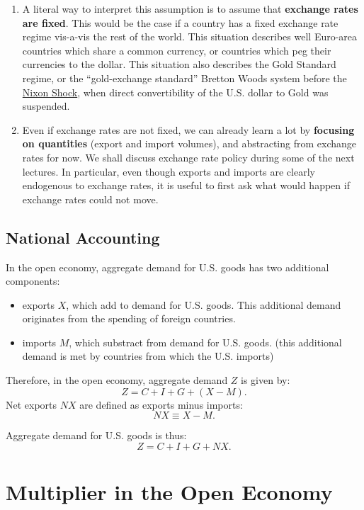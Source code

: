 \documentclass[]{book}
\providecommand{\tightlist}{%
  \setlength{\itemsep}{0pt}\setlength{\parskip}{0pt}}
\begin{document}
\begin{enumerate}
\def\labelenumi{\arabic{enumi}.}
\item
  A literal way to interpret this assumption is to assume that
  \textbf{exchange rates are fixed}. This would be the case if a country
  has a fixed exchange rate regime vis-a-vis the rest of the world. This
  situation describes well Euro-area countries which share a common
  currency, or countries which peg their currencies to the dollar. This
  situation also describes the Gold Standard regime, or the
  ``gold-exchange standard'' Bretton Woods system before the
  \href{https://en.wikipedia.org/wiki/Nixon_shock}{Nixon Shock}, when
  direct convertibility of the U.S. dollar to Gold was suspended.
\item
  Even if exchange rates are not fixed, we can already learn a lot by
  \textbf{focusing on quantities} (export and import volumes), and
  abstracting from exchange rates for now. We shall discuss exchange
  rate policy during some of the next lectures. In particular, even
  though exports and imports are clearly endogenous to exchange rates,
  it is useful to first ask what would happen if exchange rates could
  not move.
\end{enumerate}

\subsection{National Accounting}\label{national-accounting}

In the open economy, aggregate demand for U.S. goods has two additional
components:

\begin{itemize}
\tightlist
\item
  exports \(X\), which add to demand for U.S. goods. This additional
  demand originates from the spending of foreign countries.
\item
  imports \(M\), which substract from demand for U.S. goods. (this
  additional demand is met by countries from which the U.S. imports)
\end{itemize}

Therefore, in the open economy, aggregate demand \(Z\) is given by:
\[Z= C+I+G+\left(X-M\right).\] Net exports \(NX\) are defined as exports
minus imports: \[NX \equiv X-M.\]

Aggregate demand for U.S. goods is thus: \[\boxed{Z= C+I+G+NX}.\]

\section{Multiplier in the Open
Economy}\label{multiplier-in-the-open-economy}
\end{document}
